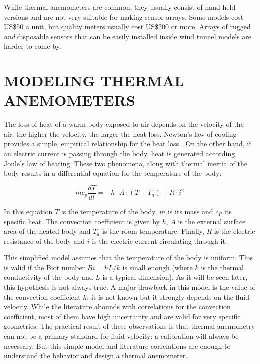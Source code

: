 \documentclass[10pt,fleqn,a4paper,twoside]{article}
\begin{document}
While thermal anemometers are common, they usually consist of  hand held versions and are not very suitable for making sensor arrays. Some models cost US\$50 a unit, but quality meters usually cost US\$200 or more. Arrays of rugged \emph{and} disposable sensors that can be easily installed inside wind tunnel models are harder to come by.


\section{MODELING THERMAL ANEMOMETERS}

The loss of heat of a warm body exposed to air depends on the velocity of the air: the higher the velocity, the larger the heat loss. Newton's law of cooling provides a simple, empirical relationship for the heat loss \citep{Incropera96}. On the other hand, if an electric current is passing through the body, heat is generated according Joule's law of heating. These two phenomena, along with thermal inertia of the body results in a differential equation for the temperature of the body:

\begin{equation}
  mc_p\frac{dT}{dt} = -h\cdot A\cdot \left(T - T_a\right) + R\cdot i^2
  \label{eq:temp}
\end{equation}

In this equation $T$ is the temperature of the body, $m$ is its mass and $c_P$ its specific heat. The convection coefficient is given by $h$, $A$ is the external surface area of the heated body and $T_a$ is the room temperature. Finally, $R$ is the electric resistance of the body and $i$ is the electric current circulating through it.

This simplified model assumes that the temperature of the body is uniform. This is valid if the Biot number $Bi = hL/k$ is small enough (where $k$ is the thermal conductivity of the body and $L$ is a typical dimension). As it will be seen later, this hypothesis is not always true. A major drawback in this model is the value of the convection coefficient $h$: it is not known but it strongly depends on the fluid velocity. While the literature abounds with correlations for the convection coefficient, most of them have high uncertainty and are valid for very specific geometries. The practical result of these observations is that thermal anemometry can not be  a primary standard for fluid velocity: a calibration will always be necessary. But this simple model and literature correlations are enough to understand the behavior and design a thermal anemometer.
\end{document}
